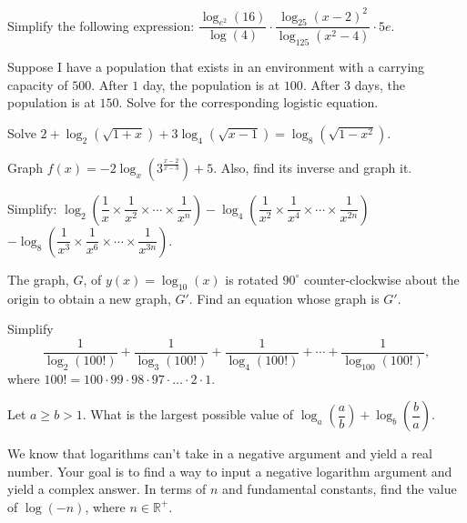 \documentclass[../book.tex]{subfiles}
\begin{document}
\begin{challengeset}
\item Simplify the following expression: $\dfrac{\log_{e^2}(16)}{\log(4)}\cdot \dfrac{\log_{25}(x-2)^2}{\log_{125}(x^2-4)}\cdot 5e$.\vspace{2mm}
\item Suppose I have a population that exists in an environment with a carrying capacity of $500$. After $1$ day, the population is at $100$. After $3$ days, the population is at $150$. Solve for the corresponding logistic equation. 
\item Solve $2+\log_2(\sqrt{1+x})+3\log_4(\sqrt{x-1})=\log_8(\sqrt{1-x^2})$.\vspace{2mm}
\item Graph $f(x)=-2\log_x\left(3^{\frac{x-2}{x-3}}\right)+5$.  Also, find its inverse and graph it.\vspace{2mm}
\item Simplify: $\log_2\left(\dfrac{1}{x}\times \dfrac{1}{x^2}\times\cdots\times \dfrac{1}{x^n}\right)-\log_4\left(\dfrac{1}{x^2}\times \dfrac{1}{x^4}\times\cdots\times \dfrac{1}{x^{2n}}\right)$ \newline $-\log_8\left(\dfrac{1}{x^3}\times \dfrac{1}{x^6}\times\cdots\times \dfrac{1}{x^{3n}}\right).$ \vspace{2mm}
\item The graph, $G$, of $y(x)=\log_{10}(x)$ is rotated $90^{\circ}$ counter-clockwise about the origin to obtain a new graph, $G'$.  Find an equation whose graph is $G'$.
\item Simplify $$\dfrac{1}{\log_2(100!)}+\dfrac{1}{\log_3(100!)}+\dfrac{1}{\log_4(100!)}+\cdots+\dfrac{1}{\log_{100}(100!)},$$ where $100!=100\cdot 99\cdot 98\cdot 97\cdot \ldots \cdot 2\cdot 1.$ \vspace{2mm}
\item Let $a\geq b>1$. What is the largest possible value of $\log_a\left(\dfrac{a}{b}\right)+\log_b\left(\dfrac{b}{a}\right)$. \vspace{2mm}
\item We know that logarithms can't take in a negative argument and yield a real number.  Your goal is to find a way to input a negative logarithm argument and yield a complex answer.  In terms of $n$ and fundamental constants, find the value of $\log(-n)$, where $n\in\mathbb{R}^+$.
\end{challengeset}
\end{document}
